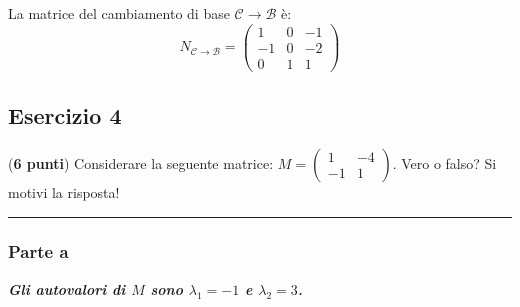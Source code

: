 \documentclass[a4paper]{article}
\newcommand{\longline}{\noindent\rule{\textwidth}{0.4pt}}
\begin{document}
	La matrice del cambiamento di base $\mathcal{C} \rightarrow \mathcal{B}$ è:
	\begin{equation*}
		N_{\mathcal{C} \rightarrow \mathcal{B}} = \begin{pmatrix}
			1	& 0	& -1 \\
			-1	& 0	& -2 \\
			0	& 1	& 1
		\end{pmatrix}
	\end{equation*}\newpage

	\subsection{Esercizio 4}

	(\textbf{6 punti}) Considerare la seguente matrice: $M = \begin{pmatrix}
		1 & -4 \\ -1 & 1
	\end{pmatrix}$. Vero o falso? Si motivi la risposta!
	
	\longline

	\subsubsection{Parte a}

	\textcolor{Green4}{\textbf{\emph{Gli autovalori di $M$ sono $\lambda_{1} = -1$ e $\lambda_{2} = 3$.}}}\newline
\end{document}
